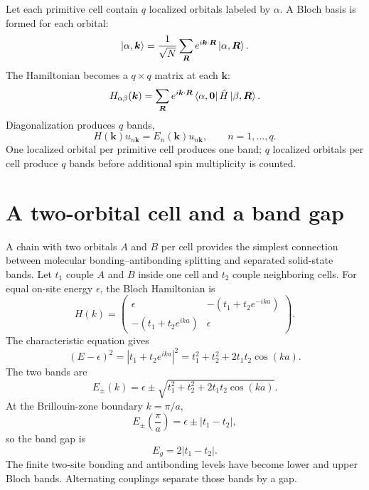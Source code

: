 Let each primitive cell contain $q$ localized orbitals labeled by $\alpha$.  A
Bloch basis is formed for each orbital:
\begin{equation}
  \ket{\alpha,\bm k}
  =\frac{1}{\sqrt N}
   \sum_{\bm R}
   e^{i\bm k\cdot\bm R}
   \ket{\alpha,\bm R}.
  \label{eq:multiorbital-bloch-basis}
\end{equation}
The Hamiltonian becomes a $q\times q$ matrix at each $\bm k$:
\begin{equation}
  H_{\alpha\beta}(\bm k)
  =\sum_{\bm R}
   e^{i\bm k\cdot\bm R}
   \bra{\alpha,\bm 0}\hat H\ket{\beta,\bm R}.
  \label{eq:multiorbital-bloch-hamiltonian}
\end{equation}
Diagonalization produces $q$ bands,
\begin{equation}
  H(\bm k)u_{n\bm k}
  =E_n(\bm k)u_{n\bm k},
  \qquad n=1,\ldots,q.
  \label{eq:multiorbital-band-eigenproblem}
\end{equation}
One localized orbital per primitive cell produces one band; $q$ localized
orbitals per cell produce $q$ bands before additional spin multiplicity is
counted.

\section{A two-orbital cell and a band gap}

A chain with two orbitals $A$ and $B$ per cell provides the simplest connection
between molecular bonding--antibonding splitting and separated solid-state
bands.  Let $t_1$ couple $A$ and $B$ inside one cell and $t_2$ couple neighboring
cells.  For equal on-site energy $\epsilon$, the Bloch Hamiltonian is
\begin{equation}
  H(k)=
  \begin{pmatrix}
    \epsilon & -(t_1+t_2e^{-ika})\\
    -(t_1+t_2e^{ika}) & \epsilon
  \end{pmatrix}.
  \label{eq:dimerized-chain-bloch-hamiltonian}
\end{equation}
The characteristic equation gives
\begin{equation}
  (E-\epsilon)^2
  =|t_1+t_2e^{ika}|^2
  =t_1^2+t_2^2+2t_1t_2\cos(ka).
  \label{eq:dimerized-chain-characteristic-equation}
\end{equation}
The two bands are
\begin{equation}
  \boxed{
  E_{\pm}(k)
  =\epsilon\pm
   \sqrt{t_1^2+t_2^2+2t_1t_2\cos(ka)}.
  }
  \label{eq:dimerized-chain-bands}
\end{equation}
At the Brillouin-zone boundary $k=\pi/a$,
\begin{equation}
  E_{\pm}\left(\frac{\pi}{a}\right)
  =\epsilon\pm|t_1-t_2|,
  \label{eq:dimerized-zone-boundary-energies}
\end{equation}
so the band gap is
\begin{equation}
  \boxed{
  E_g=2|t_1-t_2|.
  }
  \label{eq:dimerized-tight-binding-gap}
\end{equation}
The finite two-site bonding and antibonding levels have become lower and upper
Bloch bands.  Alternating couplings separate those bands by a gap.

